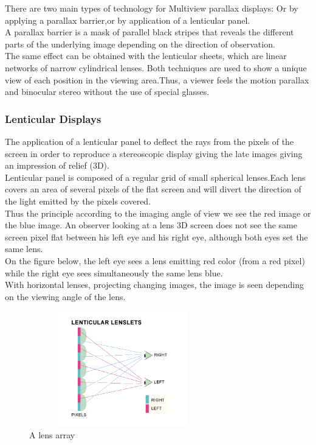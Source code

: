 There are two main types of technology for Multiview parallax displays: Or by applying a parallax barrier,or by application of a lenticular panel.\\
A parallax barrier is a mask of parallel black stripes that reveals the different parts of the underlying image depending on the direction of observation.\\ The same effect can be obtained with the lenticular sheets, which are linear networks of narrow cylindrical lenses. Both techniques are used to show a unique view of each position in the viewing area.Thus, a viewer feels the motion parallax and binocular stereo without the use of special glasses. 

\subsubsection{Lenticular Displays}

The application of a lenticular panel to deflect the rays from the pixels of the screen in order to reproduce a stereoscopic display giving the late images giving an impression of relief (3D).\\ Lenticular panel is composed of a regular grid of small spherical lenses.Each lens covers an area of several pixels of the flat screen and will divert the direction of the light emitted by the pixels covered.\\
Thus the principle according to the imaging angle of view we see the red image or the blue image. An observer looking at a lens 3D screen does not see the same screen pixel flat between his left eye and his right eye, although both eyes set the same lens.\\
On the figure below, the left eye sees a lens emitting red color (from a red pixel) while the right eye sees simultaneously the same lens blue.\\
With horizontal lenses, projecting changing images, the image is seen depending on the viewing angle of the lens.

\begin{figure}[h!]
\begin{center}
\begin{minipage}{1\linewidth}
\centering\includegraphics[width=8cm,height=5cm]{image/lentuc.png}
\caption{A lens array\cite{glasses-free3D}}
\end{minipage}
\end{center}
\end{figure}

